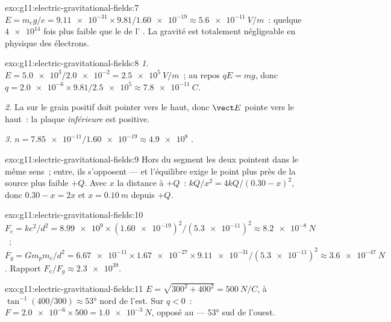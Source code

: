 \begin{solution}{exo:g11:electric-gravitational-fields:7}
$E = m_e g / e = \num{9.11e-31} \times 9.81 / \num{1.60e-19}
\approx \qty{5.6e-11}{V/m}$~: quelque $\num{4e14}$ fois plus faible que
le  de l'
. La gravité est
totalement négligeable en physique des électrons.
\end{solution}

\begin{solution}{exo:g11:electric-gravitational-fields:8}
\emph{1.} $E = \num{5.0e3} / \num{2.0e-2} = \qty{2.5e5}{V/m}$~; au repos
$qE = mg$, donc
$q = \num{2.0e-6} \times 9.81 / \num{2.5e5} \approx \qty{7.8e-11}{C}$.

\emph{2.} La  sur le grain positif doit
pointer vers le haut, donc $\vect E$ pointe vers le haut~: la plaque
\emph{inférieure} est positive.

\emph{3.} $n = \num{7.85e-11} / \num{1.60e-19} \approx \num{4.9e8}$
.
\end{solution}

\begin{solution}{exo:g11:electric-gravitational-fields:9}
Hors du segment les deux
 pointent dans le même sens~;
entre, ils s'opposent --- et l'équilibre exige le point plus près de la
source plus faible $+Q$. Avec $x$ la distance à $+Q$~:
$kQ/x^2 = 4kQ/(0.30 - x)^2$, donc $0.30 - x = 2x$ et
$x = \qty{0.10}{m}$ depuis $+Q$.
\end{solution}

\begin{solution}{exo:g11:electric-gravitational-fields:10}
$F_e = ke^2/d^2 = \num{8.99e9} \times (\num{1.60e-19})^2 /
(\num{5.3e-11})^2 \approx \qty{8.2e-8}{N}$~;
$F_g = G m_p m_e / d^2 = \num{6.67e-11} \times \num{1.67e-27} \times
\num{9.11e-31} / (\num{5.3e-11})^2 \approx \qty{3.6e-47}{N}$. Rapport
$F_e / F_g \approx \num{2.3e39}$.
\end{solution}

\begin{solution}{exo:g11:electric-gravitational-fields:11}
$E = \sqrt{300^2 + 400^2} = \qty{500}{N/C}$, à
$\tan^{-1}(400/300) \approx \ang{53}$ nord de l'est. Sur $q < 0$~:
$F = \num{2.0e-6} \times 500 = \qty{1.0e-3}{N}$, opposé au
 --- $\ang{53}$ sud de l'ouest.
\end{solution}

